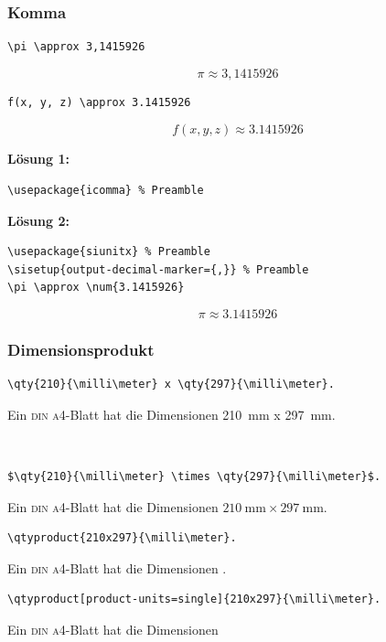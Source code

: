 \documentclass{beamer}
\begin{document}
\begin{frame}[fragile]
    \frametitle{Komma}
    \begin{wrong}
        \begin{lstlisting}
\pi \approx 3,1415926
        \end{lstlisting}
        \begin{equation*}
            \pi \approx 3,1415926
        \end{equation*}
    \end{wrong}
    \pause
    \begin{lstlisting}
f(x, y, z) \approx 3.1415926
    \end{lstlisting}
    \begin{equation*}
        f(x,y,z) \approx 3.1415926
    \end{equation*}

    \pause

    \textbf{Lösung 1:}
    \begin{lstlisting}
\usepackage{icomma} % Preamble
    \end{lstlisting}

    \pause

    \textbf{Lösung 2:}
    \begin{lstlisting}
\usepackage{siunitx} % Preamble
\sisetup{output-decimal-marker={,}} % Preamble
\pi \approx \num{3.1415926}
    \end{lstlisting}
    \begin{equation*}
        \pi \approx \num[output-decimal-marker={,}]{3.1415926}
    \end{equation*}
\end{frame}

\begin{frame}[fragile]
    \frametitle{Dimensionsprodukt}
    \begin{wrong}
        \begin{lstlisting}
\qty{210}{\milli\meter} x \qty{297}{\milli\meter}.
        \end{lstlisting}
        Ein \textsc{din a4}-Blatt hat die Dimensionen \qty{210}{\milli\meter} x \qty{297}{\milli\meter}.
    \end{wrong}\\[2ex]
    \pause

    \begin{lstlisting}
$\qty{210}{\milli\meter} \times \qty{297}{\milli\meter}$.
    \end{lstlisting}
    Ein \textsc{din a4}-Blatt hat die Dimensionen $\qty{210}{\milli\meter} \times \qty{297}{\milli\meter}$.\\[2ex]
    \pause

    \begin{lstlisting}
\qtyproduct{210x297}{\milli\meter}.
    \end{lstlisting}
    Ein \textsc{din a4}-Blatt hat die Dimensionen .

    \begin{lstlisting}
\qtyproduct[product-units=single]{210x297}{\milli\meter}.
    \end{lstlisting}
    Ein \textsc{din a4}-Blatt hat die Dimensionen 
\end{frame}
\end{document}
